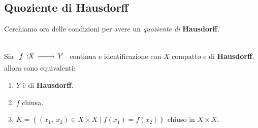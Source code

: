 \subsection{Quoziente di Hausdorff}
Cerchiamo ora delle condizioni per avere un \textit{quoziente di} \textbf{Hausdorff}.
\begin{theorema}~{}\label{quozientehausdorff}\\
Sia $\funz f X Y$ continua e identificazione con $X$ compatto e di \textbf{Hausdorff}, allora sono equivalenti:
		\begin{enumerate}
			\item $Y$ è di \textbf{Hausdorff}.
			\item $f$ chiusa.
			\item $K=\left\{ (x_1,\ x_2)\in X\times X \mid f(x_1)=f(x_2) \right\}$ chiuso in $X\times X$.
		\end{enumerate}
	\vspace{-3mm}
\end{theorema}
